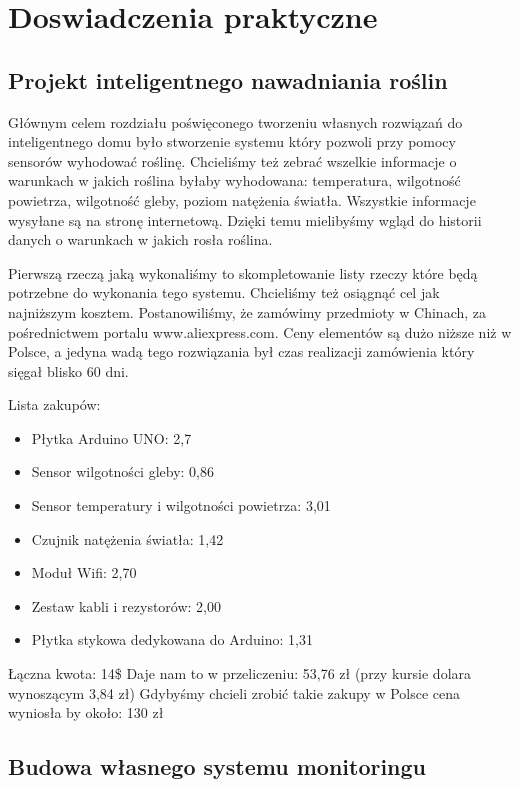 \documentclass[brudnopis]{xmgr}
\begin{document}
\chapter{Doswiadczenia praktyczne}

\section{Projekt inteligentnego nawadniania roślin}

Głównym celem rozdziału poświęconego tworzeniu własnych rozwiązań do inteligentnego domu było stworzenie systemu który pozwoli przy pomocy sensorów wyhodować roślinę. Chcieliśmy też zebrać wszelkie informacje o warunkach w jakich roślina byłaby wyhodowana: temperatura, wilgotność powietrza, wilgotność gleby, poziom natężenia światła. Wszystkie informacje wysyłane są na stronę internetową. Dzięki temu mielibyśmy wgląd do historii danych o warunkach w jakich rosła roślina. 

Pierwszą rzeczą jaką wykonaliśmy to skompletowanie listy rzeczy które będą potrzebne do wykonania tego systemu. Chcieliśmy też osiągnąć cel jak najniższym kosztem. Postanowiliśmy, że zamówimy przedmioty w Chinach, za pośrednictwem portalu www.aliexpress.com. Ceny elementów są dużo niższe niż w Polsce, a jedyna wadą tego rozwiązania był czas realizacji zamówienia który sięgał blisko 60 dni.

Lista zakupów:
\begin{itemize}
\item Płytka Arduino UNO: 2,7
\item Sensor wilgotności gleby: 0,86
\item Sensor temperatury i wilgotności powietrza: 3,01
\item Czujnik natężenia światła: 1,42
\item Moduł Wifi: 2,70
\item Zestaw kabli i rezystorów: 2,00
\item Płytka stykowa dedykowana do Arduino: 1,31
\end{itemize}
Łączna kwota: 14\$
Daje nam to w przeliczeniu: 53,76 zł (przy kursie dolara wynoszącym 3,84 zł)
Gdybyśmy chcieli zrobić takie zakupy w Polsce cena wyniosła by około: 130 zł 

\section{Budowa własnego systemu monitoringu}
\end{document}
